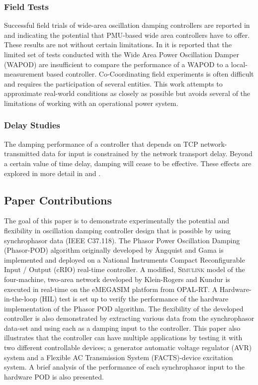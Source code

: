 \documentclass[journal]{IEEEtran}
\begin{document}
\subsubsection*{Field Tests}
Successful field trials of wide-area oscillation damping controllers are reported in \cite{WAPODNorway} and \cite{WAPODChina} indicating the potential that PMU-based wide area controllers have to offer. These results are not without certain limitations. In \cite{WAPODNorway} it is reported that the limited set of tests conducted with the Wide Area Power Oscillation Damper (WAPOD) are insufficient to compare the performance of a WAPOD to a local-measurement based controller. Co-Coordinating field experiments is often difficult and requires the participation of several entities. This work attempts to approximate real-world conditions as closely as possible but avoids several of the limitations of working with an operational power system.

\subsubsection*{Delay Studies} The damping performance of a controller that depends on TCP network-transmitted data for input is constrained by the network transport delay. Beyond a certain value of time delay, damping will cease to be effective. These effects are explored in more detail in \cite{CommDelay} and \cite{YuwaDelay}.\vspace{-1em}

\subsection{Paper Contributions}
The goal of this paper is to demonstrate experimentally the potential and flexibility in oscillation damping controller design that is possible by using synchrophasor data (IEEE C37.118). The Phasor Power Oscillation Damping (Phasor-POD) algorithm originally developed by \"{A}ngquist and Gama\cite{PhasorPOD} is implemented and deployed on a National Instruments Compact Reconfigurable Input / Output (cRIO) real-time controller. A modified, \textsc{Simulink} model of the four-machine, two-area network developed by Klein-Rogers and Kundur \cite{KundurTwoArea} is executed in real-time on the eMEGASIM \cite{eMEGASIM} platform from OPAL-RT. A Hardware-in-the-loop (HIL) test is set up to verify the performance of the hardware implementation of the Phasor POD algorithm. The flexibility of the developed controller is also demonstrated by extracting various data from the synchrophasor data-set and using each as a damping input to the controller. This paper also illustrates that the controller can have multiple applications by testing it with two different controllable devices; a generator automatic voltage regulator (AVR) system and a Flexible AC Transmission System (FACTS)-device excitation system. A brief analysis of the performance of each synchrophasor input to the hardware POD is also presented.\\\vspace{-1em}
\end{document}
